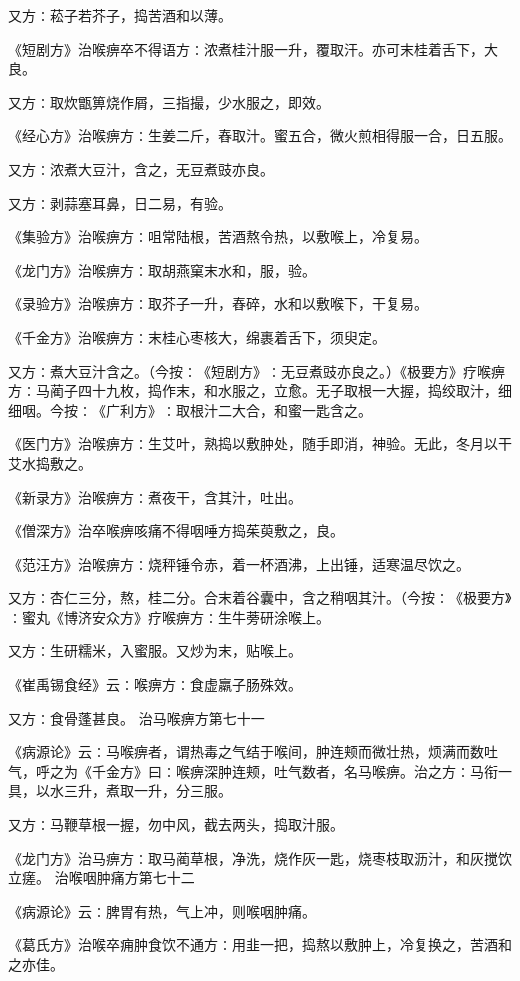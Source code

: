 \documentclass[a4paper,12pt,UTF8,twoside]{ctexbook}
\begin{document}
又方∶菘子若芥子，捣苦酒和以薄。

《短剧方》治喉痹卒不得语方∶浓煮桂汁服一升，覆取汗。亦可末桂着舌下，大良。

又方∶取炊甑箅烧作屑，三指撮，少水服之，即效。

《经心方》治喉痹方∶生姜二斤，舂取汁。蜜五合，微火煎相得服一合，日五服。

又方∶浓煮大豆汁，含之，无豆煮豉亦良。

又方∶剥蒜塞耳鼻，日二易，有验。

《集验方》治喉痹方∶咀常陆根，苦酒熬令热，以敷喉上，冷复易。

《龙门方》治喉痹方∶取胡燕窠末水和，服，验。

《录验方》治喉痹方∶取芥子一升，舂碎，水和以敷喉下，干复易。

《千金方》治喉痹方∶末桂心枣核大，绵裹着舌下，须臾定。

又方∶煮大豆汁含之。（今按∶《短剧方》∶无豆煮豉亦良之。）《极要方》疗喉痹方∶马蔺子四十九枚，捣作末，和水服之，立愈。无子取根一大握，捣绞取汁，细细咽。今按∶《广利方》∶取根汁二大合，和蜜一匙含之。

《医门方》治喉痹方∶生艾叶，熟捣以敷肿处，随手即消，神验。无此，冬月以干艾水捣敷之。

《新录方》治喉痹方∶煮夜干，含其汁，吐出。

《僧深方》治卒喉痹咳痛不得咽唾方捣茱萸敷之，良。

《范汪方》治喉痹方∶烧秤锤令赤，着一杯酒沸，上出锤，适寒温尽饮之。

又方∶杏仁三分，熬，桂二分。合末着谷囊中，含之稍咽其汁。（今按∶《极要方》∶蜜丸《博济安众方》疗喉痹方∶生牛蒡研涂喉上。

又方∶生研糯米，入蜜服。又炒为末，贴喉上。

《崔禹锡食经》云∶喉痹方∶食虚羸子肠殊效。

又方∶食骨蓬甚良。
治马喉痹方第七十一

《病源论》云∶马喉痹者，谓热毒之气结于喉间，肿连颊而微壮热，烦满而数吐气，呼之为《千金方》曰∶喉痹深肿连颊，吐气数者，名马喉痹。治之方∶马衔一具，以水三升，煮取一升，分三服。

又方∶马鞭草根一握，勿中风，截去两头，捣取汁服。

《龙门方》治马痹方∶取马蔺草根，净洗，烧作灰一匙，烧枣枝取沥汁，和灰搅饮立瘥。
治喉咽肿痛方第七十二

《病源论》云∶脾胃有热，气上冲，则喉咽肿痛。

《葛氏方》治喉卒痈肿食饮不通方∶用韭一把，捣熬以敷肿上，冷复换之，苦酒和之亦佳。
\end{document}
